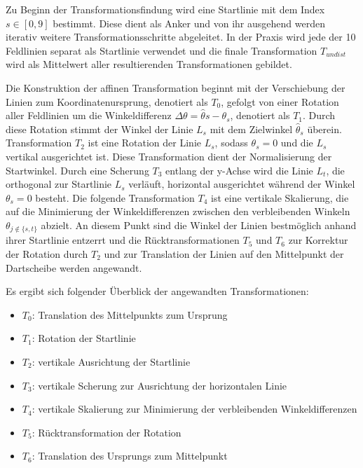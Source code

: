 Zu Beginn der Transformationsfindung wird eine Startlinie mit dem Index $s \in [0, 9]$ bestimmt. Diese dient als Anker und von ihr ausgehend werden iterativ weitere Transformationsschritte abgeleitet. In der Praxis wird jede der 10 Feldlinien separat als Startlinie verwendet und die finale Transformation $T_{undist}$ wird als Mittelwert aller resultierenden Transformationen gebildet.

Die Konstruktion der affinen Transformation beginnt mit der Verschiebung der Linien zum Koordinatenursprung, denotiert als $T_0$, gefolgt von einer Rotation aller Feldlinien um die Winkeldifferenz $\Delta \theta = \hat\theta{s} - \theta_s$, denotiert als $T_1$. Durch diese Rotation stimmt der Winkel der Linie $L_s$ mit dem Zielwinkel $\hat{\theta}_s$ überein. Transformation $T_2$ ist eine Rotation der Linie $L_s$, sodass $\theta_s = 0$ und die $L_s$ vertikal ausgerichtet ist. Diese Transformation dient der Normalisierung der Startwinkel. Durch eine Scherung $T_3$ entlang der y-Achse wird die Linie $L_t$, die orthogonal zur Startlinie $L_s$ verläuft, horizontal ausgerichtet während der Winkel $\theta_s = 0$ besteht. Die folgende Transformation $T_4$ ist eine vertikale Skalierung, die auf die Minimierung der Winkeldifferenzen zwischen den verbleibenden Winkeln $\theta_{j \notin \{s, t\}}$ abzielt. An diesem Punkt sind die Winkel der Linien bestmöglich anhand ihrer Startlinie entzerrt und die Rücktransformationen $T_5$ und $T_6$ zur Korrektur der Rotation durch $T_2$ und zur Translation der Linien auf den Mittelpunkt der Dartscheibe werden angewandt.

Es ergibt sich folgender Überblick der angewandten Transformationen:

\begin{itemize}
    \item $T_0$: Translation des Mittelpunkts zum Ursprung
    \item $T_1$: Rotation der Startlinie
    \item $T_2$: vertikale Ausrichtung der Startlinie
    \item $T_3$: vertikale Scherung zur Ausrichtung der horizontalen Linie
    \item $T_4$: vertikale Skalierung zur Minimierung der verbleibenden Winkeldifferenzen
    \item $T_5$: Rücktransformation der Rotation
    \item $T_6$: Translation des Ursprungs zum Mittelpunkt
\end{itemize}

